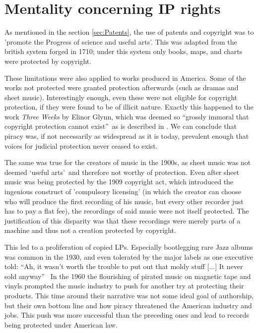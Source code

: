 \documentclass[a4paper]{report}
\begin{document}
\section{Mentality concerning IP rights}
\label{sec:IPMent}

As mentioned in the section \ref{sec:Patents}, the use of patents and copyright was to 'promote the Progress of science and useful arts'. This was adapted from the british system forged in 1710; under this system only books, maps, and charts were protected by copyright. \parencite[3]{Cummings2010}

These limitations were also applied to works produced in America. Some of the works not protected were granted protection afterwards (such as dramas and sheet music). Interestingly enough, even these were not eligible for copyright protection, if they were found to be of illicit nature.  Exactly this happened to the work \textit{Three Weeks} by Elinor Glynn, which was deemed so \textquotedblleft grossly immoral that copyright protection cannot exist\textquotedblright\ as is described in \cite{Fox1945}.
We can conclude that piracy was, if not necessarily as widespread as it is today, prevalent enough that voices for judicial protection never ceased to exist.

The same was true for the creators of music in the 1900s, as sheet music was not deemed \textquoteleft useful arts\textquoteright\ and therefore not worthy of protection. Even after sheet music was being protected by the 1909 copyright act, which introduced the ingenious construct of 'compulsory licensing' (in which the creator can choose who will produce the first recording of his music, but every other recorder just has to pay a flat fee), the recordings of said music were not itself protected. The justification of this disparity was that these recordings were merely parts of a machine and thus not a creation protected by copyright.

This led to a proliferation of copied LPs. Especially bootlegging rare Jazz albums was common in the 1930, and even tolerated by the major labels as one executive told: \textquotedblleft Ah, it wasn't worth the trouble to put out that moldy stuff [...] It never sold anyway\textquotedblright\ \parencite{Cummings2017}
In the 1960 the flourishing of pirated music on magnetic tape and vinyls prompted the music industry to push for another try at protecting their products. This time around their narrative was not some ideal goal of authorship, but their own bottom line and how piracy threatened the American industry and jobs. This push was more successful than the preceding ones and lead to records being protected under American law.
\end{document}
